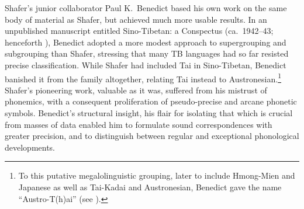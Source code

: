Shafer’s junior collaborator Paul K.\ Benedict based his own work on the same body of material as Shafer, but achieved much more usable results. In an unpublished manuscript entitled Sino-Tibetan: a Conspectus (ca.\ 1942–43; henceforth \textit{}), Benedict adopted a more modest approach to supergrouping and subgrouping than Shafer, stressing that many TB languages had so far resisted precise classification. While Shafer had included Tai in Sino-Tibetan, Benedict \citeyearpar{PKB-TKI} banished it from the family altogether, relating Tai instead to Austronesian.\footnote{To this putative megalolinguistic grouping, later to include Hmong-Mien and Japanese as well as Tai-Kadai and Austronesian, Benedict gave the name “Austro-T(h)ai” (see \citealt{PKB-ATLC,PKB-ATJ}).} Shafer’s pioneering work, valuable as it was, suffered from his mistrust of phonemics, with a consequent proliferation of pseudo-precise and arcane phonetic symbols. Benedict’s structural insight, his flair for isolating that which is crucial from masses of data  enabled him to formulate sound correspondences with greater precision, and to distinguish between regular and exceptional phonological developments.

